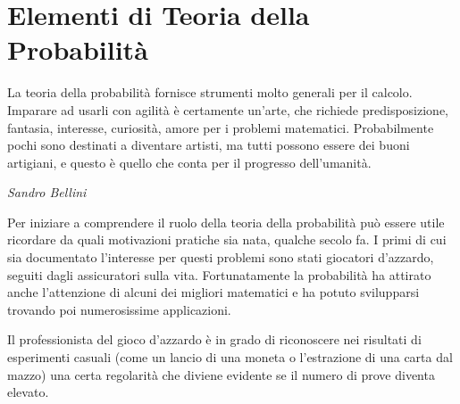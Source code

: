 \section{Elementi di Teoria della Probabilità}

\epigraph{La teoria della probabilità fornisce strumenti molto generali per il calcolo. Imparare ad usarli con agilità è certamente un’arte, che richiede predisposizione, fantasia, interesse, curiosità, amore per i problemi matematici. Probabilmente pochi sono destinati a diventare artisti, ma tutti possono essere dei buoni artigiani, e questo è quello che conta per il progresso dell’umanità.}{\textit{Sandro Bellini}}

Per iniziare a comprendere il ruolo della teoria della probabilità può essere utile ricordare da quali motivazioni pratiche sia nata, qualche secolo fa. I primi di cui sia documentato l’interesse per questi problemi sono stati giocatori d’azzardo, seguiti dagli assicuratori sulla vita. Fortunatamente la probabilità ha attirato anche l’attenzione di alcuni dei migliori matematici e ha potuto svilupparsi trovando poi numerosissime applicazioni.

Il professionista del gioco d'azzardo è in grado di riconoscere nei risultati di esperimenti casuali (come un lancio di una moneta o l'estrazione di una carta dal mazzo) una certa regolarità che diviene evidente se il numero di prove diventa elevato.

